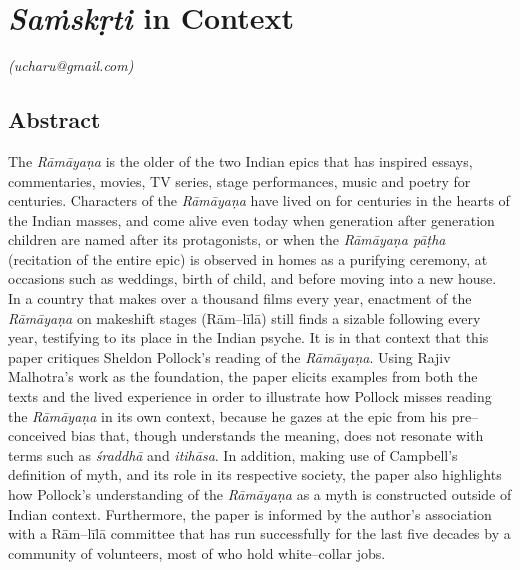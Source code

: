 
\chapter{\textit{Saṁskṛti} in Context}\label{chapter8}


\begin{flushright}
\textit{(ucharu@gmail.com)}
\end{flushright}


\section*{Abstract}

The \textit{Rāmāyaṇa} is the older of the two Indian epics that has inspired essays, commentaries, movies, TV series, stage performances, music and poetry for centuries. Characters of the \textit{Rāmāyaṇa} have lived on for centuries in the hearts of the Indian masses, and come alive even today when generation after generation children are named after its protagonists, or when the \textit{Rāmāyaṇa pāṭha} (recitation of the entire epic) is observed in homes as a purifying ceremony, at occasions such as weddings, birth of child, and before moving into a new house. In a country that makes over a thousand films every year, enactment of the \textit{Rāmāyaṇa} on makeshift stages (Rām–līlā) still finds a sizable following every year, testifying to its place in the Indian psyche. It is in that context that this paper critiques Sheldon Pollock’s reading of the \textit{Rāmāyaṇa}. Using Rajiv Malhotra’s work as the foundation, the paper elicits examples from both the texts and the lived experience in order to illustrate how Pollock misses reading the \textit{Rāmāyaṇa} in its own context, because he gazes at the epic from his pre–conceived bias that, though understands the meaning, does not resonate with terms such as \textit{śraddhā} and \textit{itihāsa}. In addition, making use of Campbell’s definition of myth, and its role in its respective society, the paper also highlights how Pollock’s understanding of the \textit{Rāmāyaṇa} as a myth is constructed outside of Indian context. Furthermore, the paper is informed by the author’s association with a Rām–līlā committee that has run successfully for the last five decades by a community of volunteers, most of who hold white–collar jobs.

